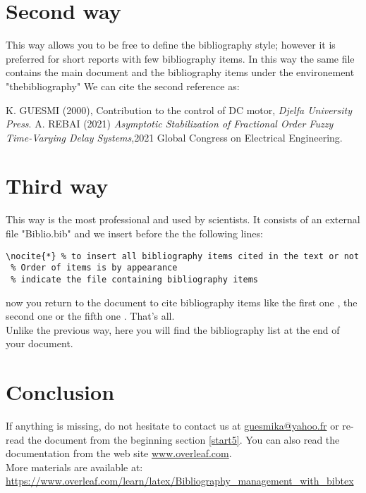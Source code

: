 \section{Second way}
This way allows you to be free to define the bibliography style; however it is preferred for short reports with few bibliography items. In this way the same file contains the main document
and the bibliography items under the environement "thebibliography"
We can cite the second reference as: \cite{ref2}
\begin{thebibliography}{9}%
	K. GUESMI (2000), Contribution to the control of DC motor, \textit{Djelfa University Press}.
	A. REBAI (2021) \emph{Asymptotic Stabilization of Fractional Order Fuzzy Time-Varying Delay Systems},2021 Global Congress on Electrical Engineering.
\end{thebibliography}
\section{Third way}
This way is the most professional and used by scientists. It consists of an external file "Biblio.bib" and we insert before the \verb== the following lines:
\begin{verbatim}
\nocite{*} % to insert all bibliography items cited in the text or not
 % Order of items is by appearance 
 % indicate the file containing bibliography items
\end{verbatim} 
now you return to the document to cite bibliography items like the first one \cite{01}, the second one \cite{02} or the fifth one \cite{05}. That's all.\\ 
Unlike the previous way, here you will find the bibliography list at the end of your document.
\section{Conclusion}
If anything is missing, do not hesitate to contact us at \href{mailto:guesmika@yahoo.fr}{guesmika@yahoo.fr} or re-read the document from the beginning section \ref{start5}. You can also read the documentation from the web site \url{www.overleaf.com}.\\
More materials are available at:\\
\url{https://www.overleaf.com/learn/latex/Bibliography_management_with_bibtex}





